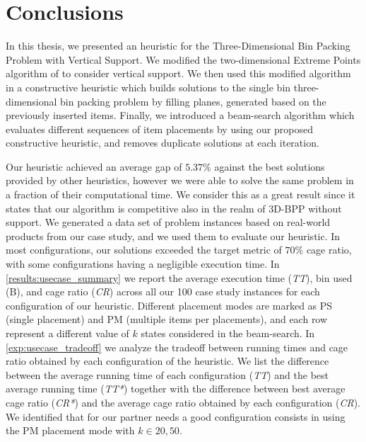 \documentclass[11pt,a4paper,twocolumn]{article}
\begin{document}
\section{Conclusions}
In this thesis, we presented an heuristic for the Three-Dimensional Bin Packing Problem with Vertical Support.
We modified the two-dimensional Extreme Points algorithm of \citet{crainic2008extreme} to consider vertical support.
We then used this modified algorithm in a constructive heuristic which builds solutions to the single bin three-dimensional bin packing problem by filling planes, generated based on the previously inserted items.
Finally, we introduced a beam-search algorithm which evaluates different sequences of item placements by using our proposed constructive heuristic, and removes duplicate solutions at each iteration.

Our heuristic achieved an average gap of $5.37\%$ against the best solutions provided by other heuristics, however we were able to solve the same problem in a fraction of their computational time.
We consider this as a great result since it states that our algorithm is competitive also in the realm of 3D-BPP without support.
We generated a data set of problem instances based on real-world products from our case study, and we used them to evaluate our heuristic.
In most configurations, our solutions exceeded the target metric of $70\%$ cage ratio, with some configurations having a negligible execution time.
In \cref{results:usecase_summary} we report the average execution time (\textit{TT}), bin used (B), and cage ratio (\textit{CR}) across all our 100 case study instances for each configuration of our heuristic. 
Different placement modes are marked as PS (single placement) and PM (multiple items per placements), and each row represent a different value of $k$ states considered in the beam-search.
In \cref{exp:usecase_tradeoff} we analyze the tradeoff between running times and cage ratio obtained by each configuration of the heuristic.
We list the difference between the average running time of each configuration (\textit{TT}) and the best average running time (\textit{TT*}) together with the difference between best average cage ratio (\textit{CR*}) and the average cage ratio obtained by each configuration (\textit{CR}).
We identified that for our partner needs a good configuration consists in using the PM placement mode with $k \in {20, 50}$.
\end{document}
